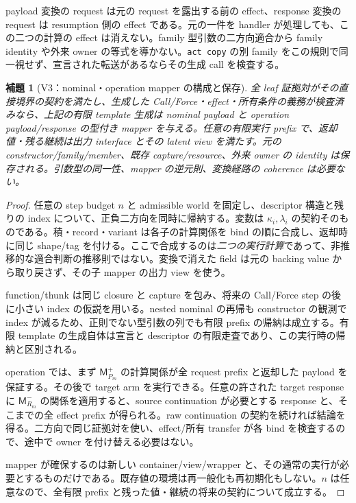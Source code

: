 \documentclass[11pt,a4paper]{article}
\newtheorem{lemma}[theorem]{補題}
\theoremstyle{remark}
\begin{document}
payload 変換の request は元の request を露出する前の effect、response 変換の request は resumption 側の effect である。元の一件を handler が処理しても、この二つの計算の effect は消えない。family 型引数の二方向適合から family identity や外来 owner の等式を導かない。\texttt{act copy} の別 family をこの規則で同一視せず、宣言された転送があるならその生成 call を検査する。

\begin{lemma}[V3：nominal・operation mapper の構成と保存]
全 leaf 証拠対がその直接境界の契約を満たし、生成した Call/Force・effect・所有条件の義務が検査済みなら、上記の有限 template 生成は nominal payload と operation payload/response の型付き mapper を与える。任意の有限実行 prefix で、返却値・残る継続は出力 interface とその latent view を満たす。元の constructor/family/member、既存 capture/resource、外来 owner の identity は保存される。引数型の同一性、mapper の逆元則、変換経路の coherence は必要ない。
\end{lemma}
\begin{proof}
任意の step budget $n$ と admissible world を固定し、descriptor 構造と残りの index について、正負二方向を同時に帰納する。変数は $\kappa_i,\lambda_i$ の契約そのものである。積・record・variant は各子の計算関係を bind の順に合成し、返却時に同じ shape/tag を付ける。ここで合成するのは\emph{二つの実行計算}であって、非推移的な適合判断の推移則ではない。変換で消えた field は元の backing value から取り戻さず、その子 mapper の出力 view を使う。

function/thunk は同じ closure と capture を包み、将来の Call/Force step の後に小さい index の仮説を用いる。nested nominal の再帰も constructor の観測で index が減るため、正則でない型引数の列でも有限 prefix の帰納は成立する。有限 template の生成自体は宣言と descriptor の有限走査であり、この実行時の帰納と区別される。

operation では、まず $\mathsf M_{P_m}^{+}$ の計算関係が全 request prefix と返却した payload を保証する。その後で target arm を実行できる。任意の許された target response に $\mathsf M_{R_m}^{-}$ の関係を適用すると、source continuation が必要とする response と、そこまでの全 effect prefix が得られる。raw continuation の契約を続ければ結論を得る。二方向で同じ証拠対を使い、effect/所有 transfer が各 bind を検査するので、途中で owner を付け替える必要はない。

mapper が確保するのは新しい container/view/wrapper と、その通常の実行が必要とするものだけである。既存値の環境は再一般化も再初期化もしない。$n$ は任意なので、全有限 prefix と残った値・継続の将来の契約について成立する。
\end{proof}
\end{document}

